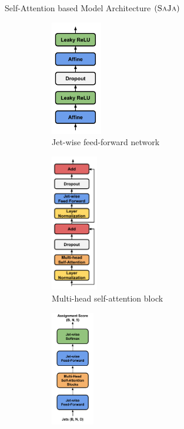 \documentclass[10pt]{beamer}
\begin{document}
\begin{frame}[fragile]{Self-Attention based Model Architecture $(\textsc{SaJa})$}
    \begin{figure}
        \centering
        \begin{subfigure}[t]{0.3\textwidth}
            \centering
            \includegraphics[width=\textwidth, height=5cm, keepaspectratio]{figures/model/jet-wise-feed-forward.pdf}
            \caption{Jet-wise feed-forward network}
        \end{subfigure}
        \hfill  
        \begin{subfigure}[t]{0.3\textwidth}
            \centering
            \includegraphics[width=\textwidth, height=6cm, keepaspectratio]{figures/model/attention-block.pdf}
            \caption{Multi-head self-attention block}
        \end{subfigure}
        \hfill
        \begin{subfigure}[t]{0.3\textwidth}
            \centering
            \includegraphics[width=\textwidth, height=5cm, keepaspectratio]{figures/model/model.pdf}

\end{subfigure}
\end{figure}
\end{frame}
\end{document}
